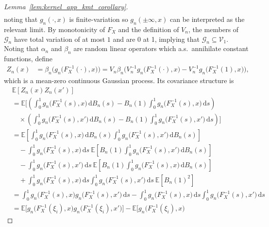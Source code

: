 \documentclass[11pt,lof]{puthesis}
\newcommand{\E}{\ensuremath{\mathbb{E}}}
\newcommand{\cG}{\ensuremath{\mathcal{G}}}
\newcommand{\cV}{\ensuremath{\mathcal{V}}}
\newcommand{\diff}[1]{\,\mathrm{d}#1}
\theoremstyle{break}
\theoremstyle{proof}
\newtheorem{proof}{Proof}
\begin{document}
\begin{proof}[Lemma~\ref{lem:kernel_app_kmt_corollary}]
\begin{align*}
  \end{align*}
  noting that $g_n(\cdot,x)$
  is finite-variation so
  $g_n(\pm \infty, x)$
  can be interpreted as
  the relevant limit.
  By monotonicity of $F_X$ and the definition of $V_n$,
  the members of $\cG_n$ have total variation of at most $1$
  and are 0 at 1, implying that
  $\cG_n \subseteq \cV_1$.
  Noting that $\alpha_n$ and $\beta_n$ are random
  linear operators which a.s.\ annihilate
  constant functions,
  define
  \begin{align*}
    Z_n(x)
    &=
    \beta_n \Big(g_n\big(F_X^{-1}(\cdot), x\big)\Big)
    = V_n \beta_n \Big(
      V_n^{-1} g_n\big(F_X^{-1}(\cdot), x\big)
      - V_n^{-1} g_n\big(F_X^{-1}(1), x\big)
    \Big),
  \end{align*}
  which is a mean-zero continuous Gaussian process.
  Its covariance structure is
  \begin{align*}
    &\E[Z_n(x) Z_n(x')] \\
    &=
    \E\bigg[
      \left(
        \int_0^1 g_n\big(F_X^{-1}(s),x\big) \diff{B_n(s)}
        - B_n(1) \int_0^1 g_n\big(F_X^{-1}(s),x\big) \diff{s}
      \right) \\
      &\quad\times
      \left(
        \int_0^1 g_n\big(F_X^{-1}(s),x'\big) \diff{B_n(s)}
        - B_n(1) \int_0^1 g_n\big(F_X^{-1}(s),x'\big) \diff{s}
      \right)
    \bigg] \\
    &=
    \E\left[
      \int_0^1 g_n\big(F_X^{-1}(s),x\big) \diff{B_n(s)}
      \int_0^1 g_n\big(F_X^{-1}(s),x'\big) \diff{B_n(s)}
    \right] \\
    &\quad- \int_0^1 g_n\big(F_X^{-1}(s),x\big) \diff{s} \
    \E\left[
      B_n(1) \int_0^1 g_n\big(F_X^{-1}(s),x'\big) \diff{B_n(s)}
    \right] \\
    &\quad-
    \int_0^1 g_n\big(F_X^{-1}(s),x'\big) \diff{s} \
    \E\left[
      B_n(1) \int_0^1 g_n\big(F_X^{-1}(s),x\big) \diff{B_n(s)}
    \right] \\
    &\quad+
    \int_0^1 g_n\big(F_X^{-1}(s),x\big) \diff{s}
    \int_0^1 g_n\big(F_X^{-1}(s),x'\big) \diff{s} \
    \E\left[
      B_n(1)^2
    \right] \\
    &=
    \int_0^1 g_n\big(F_X^{-1}(s),x\big)
    g_n\big(F_X^{-1}(s),x'\big) \diff{s}
    - \int_0^1 g_n\big(F_X^{-1}(s),x\big) \diff{s}
    \int_0^1 g_n\big(F_X^{-1}(s),x'\big) \diff{s} \\
    &=
    \E\Big[
      g_n\big(F_X^{-1}(\xi_i), x\big)
      g_n\big(F_X^{-1}(\xi_i), x'\big)
    \Big]
    - \E\Big[
      g_n\big(F_X^{-1}(\xi_i), x\big)

\end{align*}
\end{proof}
\end{document}
